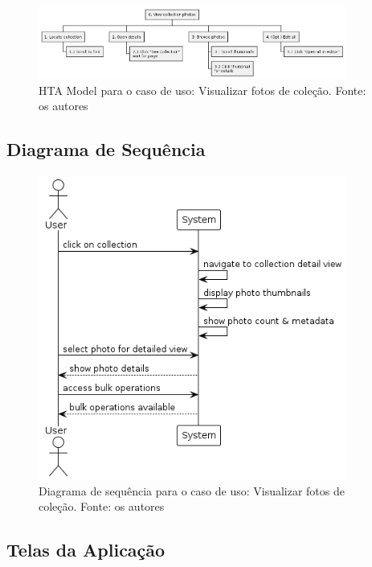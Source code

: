\begin{figure}[H]
    \centering
    \includegraphics[width=0.9\textwidth]{../figures/hta/UC010.png}
    \caption{HTA Model para o caso de uso: Visualizar fotos de coleção. Fonte: os autores}
    \label{fig:hta-uc010}
\end{figure}

\subsection{Diagrama de Sequência}

\begin{figure}[H]
    \centering
    \includegraphics[width=0.9\textwidth]{../figures/dss/UC010.png}
    \caption{Diagrama de sequência para o caso de uso: Visualizar fotos de coleção. Fonte: os autores}
    \label{fig:dss-uc010}
\end{figure}

\subsection{Telas da Aplicação}

